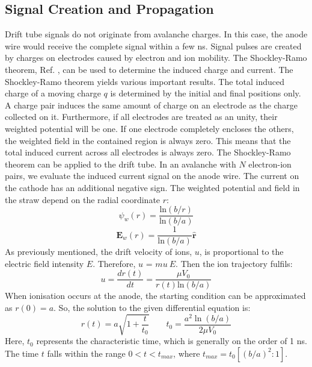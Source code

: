 \subsection{Signal Creation and Propagation}
Drift tube signals do not originate from avalanche charges. In this case, the anode wire would 
receive the complete signal within a few ns. Signal pulses are created by charges on electrodes 
caused by electron and ion mobility. The Shockley-Ramo theorem, Ref. \cite{kola}, can be 
used to determine the induced charge and current. 
The Shockley-Ramo theorem yields various important results. The total induced charge of a moving charge 
$q$ is determined by the initial and final positions only.  A charge pair induces the same amount of 
charge on an electrode as the charge collected on it. Furthermore, if all electrodes are treated as 
an unity, their weighted potential will be one. 
If one electrode completely encloses the others, the weighted field in the contained region is always zero. 
This means that the total induced current across all electrodes is always zero. The Shockley-Ramo theorem can 
be applied to the drift tube. In an avalanche with $N$ electron-ion pairs, we evaluate the induced current 
signal on the anode wire. The current on the cathode has an additional negative sign. The weighted 
potential and field in the straw depend on the radial coordinate $r$:
\begin{equation}
    \psi_w(r)=\frac{\text{ln}(b/r)}{\text{ln}(b/a)}
\end{equation}
\begin{equation}
    \textbf{E}_w(r)=\frac{1}{\text{ln}(b/a)}\hat{\textbf{r}}
\end{equation}
As previously mentioned, the drift velocity of ions, $u$, is proportional to the electric field intensity $E$. Therefore, $u$ = $mu \ E$. 
Then the ion trajectory fulfils:
\begin{equation}
    u=\frac{dr(t)}{dt}=\frac{\mu V_0}{r(t)\text{ln}(b/a)}
\end{equation}
When ionisation occurs at the anode, the starting condition can be approximated as $r(0) = a$. So, the solution to the given differential equation is:
 \begin{equation}
    r(t)=a \sqrt{1+\frac{t}{t_0}} \qquad t_0=\frac{a^2 \ln (b / a)}{2 \mu V_0}
    \end{equation}
Here, $t_0$ represents the characteristic time, which is generally on the order of 1 ns. 
The time $t$ falls within the range $0 < t < t_{max}$, where $t_{max} = t_0 [(b/a)^2: 1]$. 
